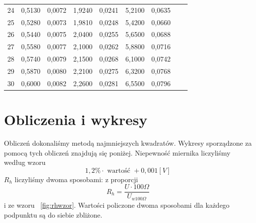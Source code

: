 \documentclass[10pt,a4paper]{article}
\begin{document}
\begin{tabular}{c|c|c|c|c|c|c|c|c}
24	&	0,5130	&	0,0072	&	1,9240	&	0,0241	&	5,2100	&	0,0635	&		&		 \\
25	&	0,5280	&	0,0073	&	1,9810	&	0,0248	&	5,4200	&	0,0660	&		&		 \\
26	&	0,5440	&	0,0075	&	2,0400	&	0,0255	&	5,6500	&	0,0688	&		&		 \\
27	&	0,5580	&	0,0077	&	2,1000	&	0,0262	&	5,8800	&	0,0716	&		&		 \\
28	&	0,5740	&	0,0079	&	2,1500	&	0,0268	&	6,1000	&	0,0742	&		&		 \\
29	&	0,5870	&	0,0080	&	2,2100	&	0,0275	&	6,3200	&	0,0768	&		&		 \\
30	&	0,6000	&	0,0082	&	2,2600	&	0,0281	&	6,5500	&	0,0796	&		&		 \\
\end{tabular}

\newpage
\section{Obliczenia i wykresy}
Obliczeń dokonaliśmy metodą najmniejszych kwadratów. Wykresy sporządzone za pomocą tych obliczeń znajdują się poniżej. Niepewność miernika liczyliśmy według wzoru
\begin{equation}
1,2\% \cdot \text{ wartość } + 0,001 [V]
\end{equation} 
$R_h$ liczyliśmy dwoma sposobami: z proporcji
\begin{equation}
R_h = \frac{U\cdot 100\Omega}{U_{w 100\Omega}}
\end{equation} 
i ze wzoru ~\ref{fig:rhwzor}. Wartości policzone dwoma sposobami dla każdego podpunktu są do siebie zbliżone.


\end{document}
